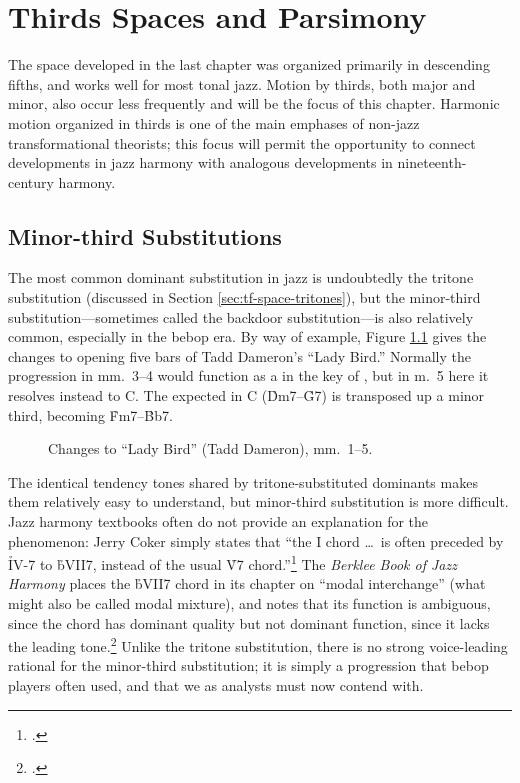 
\chapter{Thirds Spaces and Parsimony}

The space developed in the last chapter was organized primarily in descending
fifths, and works well for most tonal jazz. Motion by thirds, both major and
minor, also occur less frequently and will be the focus of this chapter.
Harmonic motion organized in thirds is one of the main emphases of non-jazz
transformational theorists; this focus will permit the opportunity to
connect developments in jazz harmony with analogous developments in
nineteenth-century harmony.

\section{Minor-third Substitutions}
\label{sec:minor-third-subst}

The most common dominant substitution in jazz is undoubtedly the tritone
substitution (discussed in Section \ref{sec:tf-space-tritones}), but the
minor-third substitution---sometimes called the backdoor substitution---is also
relatively common, especially in the bebop era. By way of example, Figure
\ref{mts:ladybird-changes} gives the changes to opening five bars of Tadd
Dameron's ``Lady Bird.'' Normally the progression in mm.~3--4 would function
as a \tf in the key of \Eflat, but in m.~5 here it resolves instead to C. The
expected \tf in C (\h{Dm7}--\h{G7}) is transposed up a minor third, becoming
\h{Fm7}--\h{Bb7}.

\begin{figure}[tbp]
  \caption{Changes to ``Lady Bird'' (Tadd Dameron), mm.~1--5.}
  \label{mts:ladybird-changes}
\end{figure}

The identical tendency tones shared by tritone-substituted dominants makes
them relatively easy to understand, but minor-third substitution is more
difficult. Jazz harmony textbooks often do not provide an explanation for the
phenomenon: Jerry Coker simply states that ``the I chord \ldots\ is often
preceded by \h{IV-7} to \h{bVII7}, instead of the usual \h{V7}
chord.''\footcite[82]{coker:elements} The \emph{Berklee Book of Jazz Harmony}
places the \h{bVII7} chord in its chapter on ``modal interchange'' (what might
also be called modal mixture), and notes that its function is ambiguous, since
the chord has dominant quality but not dominant function, since it lacks the
leading tone.\footcite[123--24]{berklee:harmony} Unlike the tritone
substitution, there is no strong voice-leading rational for the minor-third
substitution; it is simply a progression that bebop players often used, and
that we as analysts must now contend with.

